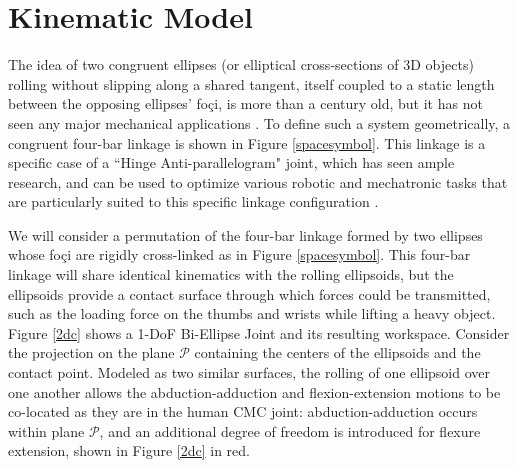 \documentclass[journal]{IEEEtran}
\begin{document}
 \section{Kinematic Model}
 \label{kinmodel}

The idea of two congruent ellipses (or elliptical cross-sections of 3D objects) rolling without slipping along a shared tangent, itself coupled to a static length between the opposing ellipses' foçi, is more than a century old, but it has not seen any major mechanical applications \cite{Blake} \cite{thingiverse}. To define such a system geometrically, a congruent four-bar linkage is shown in Figure \ref{spacesymbol}. This linkage is a specific case of a ``Hinge Anti-parallelogram" joint, which has seen ample research, and can be used to optimize various robotic and mechatronic tasks that are particularly suited to this specific linkage configuration \cite{springer2020}.

We will consider a permutation of the four-bar linkage formed by two ellipses whose foçi are rigidly cross-linked as in Figure \ref{spacesymbol}. This four-bar linkage will share identical kinematics with the rolling ellipsoids, but the ellipsoids provide a contact surface through which forces could be transmitted, such as the loading force on the thumbs and wrists while lifting a heavy object. Figure \ref{2dc} shows a 1-DoF Bi-Ellipse Joint and its resulting workspace. Consider the projection on the plane $\mathcal{P}$ containing the centers of the ellipsoids and the contact point. Modeled as two similar surfaces, the rolling of one ellipsoid over one another allows the abduction-adduction and flexion-extension motions to be co-located as they are in the human CMC joint: abduction-adduction occurs within plane $\mathcal{P}$, and an additional degree of freedom is introduced for flexure extension, shown in Figure \ref{2dc} in red. 
\end{document}
